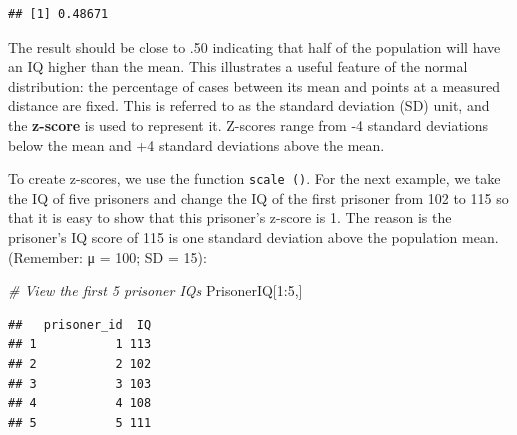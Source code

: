 \documentclass[
]{book}
\newenvironment{Shaded}{\begin{snugshade}}{\end{snugshade}}
\newcommand{\CommentTok}[1]{\textcolor[rgb]{0.56,0.35,0.01}{\textit{#1}}}
\newcommand{\DecValTok}[1]{\textcolor[rgb]{0.00,0.00,0.81}{#1}}
\newcommand{\FunctionTok}[1]{\textcolor[rgb]{0.00,0.00,0.00}{#1}}
\newcommand{\NormalTok}[1]{#1}
\newcommand{\OtherTok}[1]{\textcolor[rgb]{0.56,0.35,0.01}{#1}}
\newcommand{\SpecialCharTok}[1]{\textcolor[rgb]{0.00,0.00,0.00}{#1}}
\begin{document}
\begin{verbatim}
## [1] 0.48671
\end{verbatim}

The result should be close to .50 indicating that half of the population will have an IQ higher than the mean. This illustrates a useful feature of the normal distribution: the percentage of cases between its mean and points at a measured distance are fixed. This is referred to as the standard deviation (SD) unit, and the \textbf{z-score} is used to represent it. Z-scores range from -4 standard deviations below the mean and +4 standard deviations above the mean.

To create z-scores, we use the function \texttt{scale\ ()}. For the next example, we take the IQ of five prisoners and change the IQ of the first prisoner from 102 to 115 so that it is easy to show that this prisoner's z-score is 1. The reason is the prisoner's IQ score of 115 is one standard deviation above the population mean. (Remember: μ = 100; SD = 15):

\begin{Shaded}
\begin{Highlighting}[]
\CommentTok{\# View the first 5 prisoner IQs}
\NormalTok{PrisonerIQ[}\DecValTok{1}\SpecialCharTok{:}\DecValTok{5}\NormalTok{,] }
\end{Highlighting}
\end{Shaded}

\begin{verbatim}
##   prisoner_id  IQ
## 1           1 113
## 2           2 102
## 3           3 103
## 4           4 108
## 5           5 111
\end{verbatim}

\begin{Shaded}
\end{Shaded}
\end{document}

